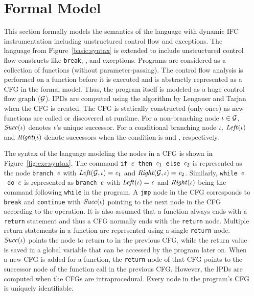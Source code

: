 \section{Formal Model} 
\label{sec:formalexc}

This section formally models the semantics of the language with
dynamic IFC instrumentation including unstructured control flow and
exceptions. The language from Figure~\ref{basic:syntax} is extended to
include unstructured control flow constructs like \texttt{break},
,  and exceptions. Programs are considered as a 
collection of functions (without parameter-passing). The control flow
analysis is performed on a function before it is executed and is
abstractly represented as a CFG in the formal model.
Thus, the program itself is modeled as a huge
control flow graph ($\mathcal{G}$). IPDs are computed using the algorithm by
Lengauer and Tarjan~\cite{Lengauer} when the CFG is created. The CFG
is statically constructed (only once) as new functions are called or
discovered at runtime. For a non-branching node $\iota \in \mathcal{G}$,
$\mathit{Succ}(\iota)$ denotes $\iota$’s unique successor. For a conditional 
branching node $\iota$,  $\mathit{Left}(\iota)$ and $\mathit{Right}(\iota)$ denote
successors when the condition is  and ,
respectively.  

The syntax of the language modeling the nodes in a CFG is shown in
Figure~\ref{fig:exc:syntax}. The command 
\texttt{if}~$\mathit{e}$~\texttt{then}~$\mathit{c}_1$~\texttt{else}~$\mathit{c}_2 $
is represented as the node \texttt{branch}~$\mathit{e}$ with $\mathit{Left}(\mathcal{G},
\iota) = \mathit{c}_1$ and $\mathit{Right}(\mathcal{G}, \iota) = \mathit{c}_2$. Similarly,
\texttt{while}~$\mathit{e}$~\texttt{do}~$\mathit{c}$ is represented as
\texttt{branch}~$\mathit{e}$ with $\mathit{Left}(\iota) = \mathit{c}$ and
$\mathit{Right}(\iota)$ being the command following \texttt{while} in the
program. A \texttt{jmp} node in the CFG corresponds to \texttt{break}
and \texttt{continue} with $\mathit{Succ}(\iota)$ pointing to the next
node in the CFG according to the operation. It is also assumed that a
function always ends with a \texttt{return} statement and thus a CFG
normally ends with the \texttt{return} node. Multiple return
statements in a function are represented using a single
\texttt{return} node. $\mathit{Succ}(\iota)$ points the
node to return to in the previous CFG, while the return value is saved
in a global variable that can be accessed by the program later on. 
When a new CFG is added for a function, the \texttt{return} node of
that CFG points to the successor node of the function call in the
previous CFG. However, the IPDs are computed when the CFGs are
intraprocedural. Every node in the program's CFG is uniquely
identifiable. 

